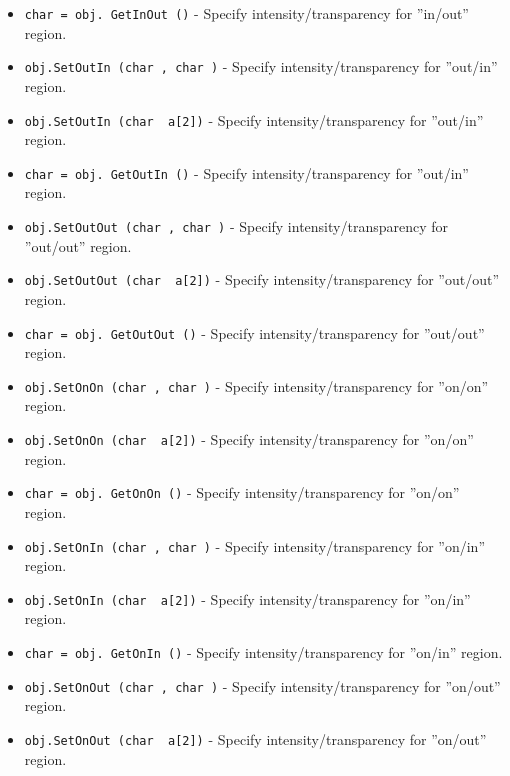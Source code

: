 \begin{itemize}
\item  \verb|char = obj. GetInOut ()| -  Specify intensity/transparency for ''in/out'' region.

\item  \verb|obj.SetOutIn (char , char )| -  Specify intensity/transparency for ''out/in'' region.

\item  \verb|obj.SetOutIn (char  a[2])| -  Specify intensity/transparency for ''out/in'' region.

\item  \verb|char = obj. GetOutIn ()| -  Specify intensity/transparency for ''out/in'' region.

\item  \verb|obj.SetOutOut (char , char )| -  Specify intensity/transparency for ''out/out'' region.

\item  \verb|obj.SetOutOut (char  a[2])| -  Specify intensity/transparency for ''out/out'' region.

\item  \verb|char = obj. GetOutOut ()| -  Specify intensity/transparency for ''out/out'' region.

\item  \verb|obj.SetOnOn (char , char )| -  Specify intensity/transparency for ''on/on'' region.

\item  \verb|obj.SetOnOn (char  a[2])| -  Specify intensity/transparency for ''on/on'' region.

\item  \verb|char = obj. GetOnOn ()| -  Specify intensity/transparency for ''on/on'' region.

\item  \verb|obj.SetOnIn (char , char )| -  Specify intensity/transparency for ''on/in'' region.

\item  \verb|obj.SetOnIn (char  a[2])| -  Specify intensity/transparency for ''on/in'' region.

\item  \verb|char = obj. GetOnIn ()| -  Specify intensity/transparency for ''on/in'' region.

\item  \verb|obj.SetOnOut (char , char )| -  Specify intensity/transparency for ''on/out'' region.

\item  \verb|obj.SetOnOut (char  a[2])| -  Specify intensity/transparency for ''on/out'' region.


\end{itemize}
